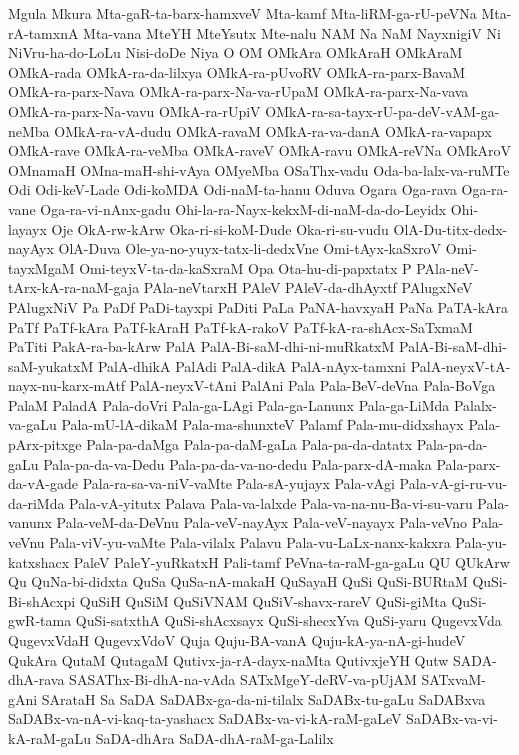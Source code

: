 {Mgula
Mkura
Mta-gaR-ta-barx-hamxveV
Mta-kamf
Mta-liRM-ga-rU-peVNa
Mta-rA-tamxnA
Mta-vana
MteYH
MteYsutx
Mte-nalu
NAM
Na
NaM
NayxnigiV
Ni
NiVru-ha-do-LoLu
Nisi-doDe
Niya
O
OM
OMkAra
OMkAraH
OMkAraM
OMkA-rada
OMkA-ra-da-lilxya
OMkA-ra-pUvoRV
OMkA-ra-parx-BavaM
OMkA-ra-parx-Nava
OMkA-ra-parx-Na-va-rUpaM
OMkA-ra-parx-Na-vava
OMkA-ra-parx-Na-vavu
OMkA-ra-rUpiV
OMkA-ra-sa-tayx-rU-pa-deV-vAM-ga-neMba
OMkA-ra-vA-dudu
OMkA-ravaM
OMkA-ra-va-danA
OMkA-ra-vapapx
OMkA-rave
OMkA-ra-veMba
OMkA-raveV
OMkA-ravu
OMkA-reVNa
OMkAroV
OMnamaH
OMna-maH-shi-vAya
OMyeMba
OSaThx-vadu
Oda-ba-lalx-va-ruMTe
Odi
Odi-keV-Lade
Odi-koMDA
Odi-naM-ta-hanu
Oduva
Ogara
Oga-rava
Oga-ra-vane
Oga-ra-vi-nAnx-gadu
Ohi-la-ra-Nayx-kekxM-di-naM-da-do-Leyidx
Ohi-layayx
Oje
OkA-rw-kArw
Oka-ri-si-koM-Dude
Oka-ri-su-vudu
OlA-Du-titx-dedx-nayAyx
OlA-Duva
Ole-ya-no-yuyx-tatx-li-dedxVne
Omi-tAyx-kaSxroV
Omi-tayxMgaM
Omi-teyxV-ta-da-kaSxraM
Opa
Ota-hu-di-papxtatx
P
PAla-neV-tArx-kA-ra-naM-gaja
PAla-neVtarxH
PAleV
PAleV-da-dhAyxtf
PAlugxNeV
PAlugxNiV
Pa
PaDf
PaDi-tayxpi
PaDiti
PaLa
PaNA-havxyaH
PaNa
PaTA-kAra
PaTf
PaTf-kAra
PaTf-kAraH
PaTf-kA-rakoV
PaTf-kA-ra-shAcx-SaTxmaM
PaTiti
PakA-ra-ba-kArw
PalA
PalA-Bi-saM-dhi-ni-muRkatxM
PalA-Bi-saM-dhi-saM-yukatxM
PalA-dhikA
PalAdi
PalA-dikA
PalA-nAyx-tamxni
PalA-neyxV-tA-nayx-nu-karx-mAtf
PalA-neyxV-tAni
PalAni
Pala
Pala-BeV-deVna
Pala-BoVga
PalaM
PaladA
Pala-doVri
Pala-ga-LAgi
Pala-ga-Lanunx
Pala-ga-LiMda
Palalx-va-gaLu
Pala-mU-lA-dikaM
Pala-ma-shunxteV
Palamf
Pala-mu-didxshayx
Pala-pArx-pitxge
Pala-pa-daMga
Pala-pa-daM-gaLa
Pala-pa-da-datatx
Pala-pa-da-gaLu
Pala-pa-da-va-Dedu
Pala-pa-da-va-no-dedu
Pala-parx-dA-maka
Pala-parx-da-vA-gade
Pala-ra-sa-va-niV-vaMte
Pala-sA-yujayx
Pala-vAgi
Pala-vA-gi-ru-vu-da-riMda
Pala-vA-yitutx
Palava
Pala-va-lalxde
Pala-va-na-nu-Ba-vi-su-varu
Pala-vanunx
Pala-veM-da-DeVnu
Pala-veV-nayAyx
Pala-veV-nayayx
Pala-veVno
Pala-veVnu
Pala-viV-yu-vaMte
Pala-vilalx
Palavu
Pala-vu-LaLx-nanx-kakxra
Pala-yu-katxshacx
PaleV
PaleY-yuRkatxH
Pali-tamf
PeVna-ta-raM-ga-gaLu
QU
QUkArw
Qu
QuNa-bi-didxta
QuSa
QuSa-nA-makaH
QuSayaH
QuSi
QuSi-BURtaM
QuSi-Bi-shAcxpi
QuSiH
QuSiM
QuSiVNAM
QuSiV-shavx-rareV
QuSi-giMta
QuSi-gwR-tama
QuSi-satxthA
QuSi-shAcxsayx
QuSi-shecxYva
QuSi-yaru
QugevxVda
QugevxVdaH
QugevxVdoV
Quja
Quju-BA-vanA
Quju-kA-ya-nA-gi-hudeV
QukAra
QutaM
QutagaM
Qutivx-ja-rA-dayx-naMta
QutivxjeYH
Qutw
SADA-dhA-rava
SASAThx-Bi-dhA-na-vAda
SATxMgeY-deRV-va-pUjAM
SATxvaM-gAni
SArataH
Sa
SaDA
SaDABx-ga-da-ni-tilalx
SaDABx-tu-gaLu
SaDABxva
SaDABx-va-nA-vi-kaq-ta-yashacx
SaDABx-va-vi-kA-raM-gaLeV
SaDABx-va-vi-kA-raM-gaLu
SaDA-dhAra
SaDA-dhA-raM-ga-Lalilx
}

